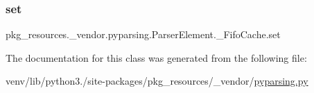 \subsubsection{\texorpdfstring{set}{set}}
{\footnotesize\ttfamily pkg\+\_\+resources.\+\_\+vendor.\+pyparsing.\+Parser\+Element.\+\_\+\+Fifo\+Cache.\+set}



The documentation for this class was generated from the following file\+:\begin{DoxyCompactItemize}
\item 
venv/lib/python3./site-\/packages/pkg\+\_\+resources/\+\_\+vendor/\hyperlink{pkg__resources_2__vendor_2pyparsing_8py}{pyparsing.\+py}\end{DoxyCompactItemize}

